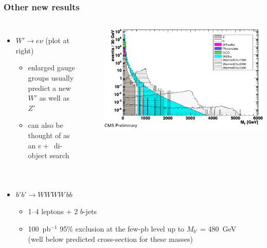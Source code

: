 \documentclass[compress]{beamer}
\begin{document}


\begin{frame}
\frametitle{Other new results}

\vspace{-0.4 cm}
\begin{columns}
\begin{itemize}
\item $W' \to e \nu$ (plot at right)
\begin{itemize}
\item enlarged gauge groups usually predict a new $W'$ as well as $Z'$
\item can also be thought of as an $e+$\met\ di-object search
\end{itemize}
\end{itemize}

\mbox{ }


\vspace{0.5 cm}
\includegraphics[width=\linewidth]{Wprime_enu_backgrounds.png}
\end{columns}

\vspace{-1.3 cm}
\begin{columns}
\begin{itemize}
\item $b'b' \to WWWW \, bb$
\begin{itemize}
\item 1--4 leptons $+$ 2 $b$-jets
\item 100~pb$^{-1}$ 95\% exclusion at the few-pb level up to $M_{b'}$ = 480~GeV \\ (well below predicted cross-section for these masses)
\end{itemize}


\end{itemize}
\end{columns}
\end{frame}
\end{document}

